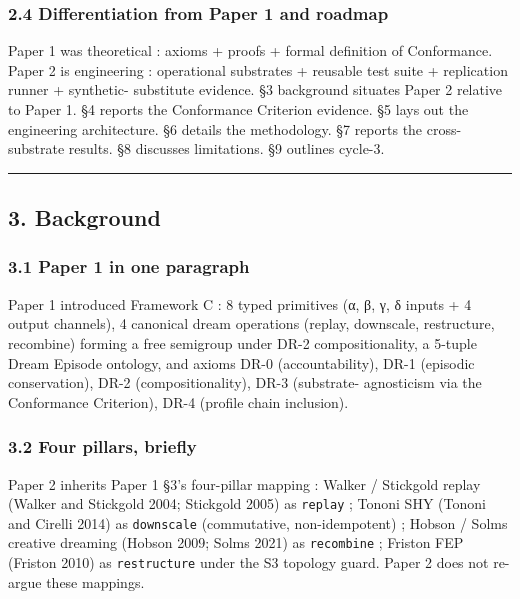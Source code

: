 \documentclass[
]{article}
\begin{document}
\subsubsection{2.4 Differentiation from Paper 1 and
roadmap}\label{differentiation-from-paper-1-and-roadmap}

Paper 1 was theoretical : axioms + proofs + formal definition of
Conformance. Paper 2 is engineering : operational substrates + reusable
test suite + replication runner + synthetic- substitute evidence. §3
background situates Paper 2 relative to Paper 1. §4 reports the
Conformance Criterion evidence. §5 lays out the engineering
architecture. §6 details the methodology. §7 reports the cross-substrate
results. §8 discusses limitations. §9 outlines cycle-3.

\begin{center}\rule{0.5\linewidth}{0.5pt}\end{center}

\subsection{3. Background}\label{background}

\subsubsection{3.1 Paper 1 in one
paragraph}\label{paper-1-in-one-paragraph}

Paper 1 introduced Framework C : 8 typed primitives (α, β, γ, δ inputs +
4 output channels), 4 canonical dream operations (replay, downscale,
restructure, recombine) forming a free semigroup under DR-2
compositionality, a 5-tuple Dream Episode ontology, and axioms DR-0
(accountability), DR-1 (episodic conservation), DR-2 (compositionality),
DR-3 (substrate- agnosticism via the Conformance Criterion), DR-4
(profile chain inclusion).

\subsubsection{3.2 Four pillars, briefly}\label{four-pillars-briefly}

Paper 2 inherits Paper 1 §3's four-pillar mapping : Walker / Stickgold
replay (Walker and Stickgold 2004; Stickgold 2005) as \texttt{replay} ;
Tononi SHY (Tononi and Cirelli 2014) as \texttt{downscale} (commutative,
non-idempotent) ; Hobson / Solms creative dreaming (Hobson 2009; Solms
2021) as \texttt{recombine} ; Friston FEP (Friston 2010) as
\texttt{restructure} under the S3 topology guard. Paper 2 does not
re-argue these mappings.
\end{document}
